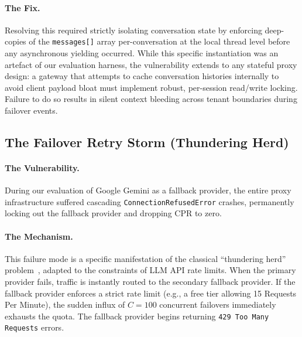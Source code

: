 \paragraph{The Fix.}
Resolving this required strictly isolating conversation state by enforcing deep-copies of the \texttt{messages[]} array per-conversation at the local thread level before any asynchronous yielding occurred. While this specific instantiation was an artefact of our evaluation harness, the vulnerability extends to any stateful proxy design: a gateway that attempts to cache conversation histories internally to avoid client payload bloat must implement robust, per-session read/write locking. Failure to do so results in silent context bleeding across tenant boundaries during failover events.

\subsection{The Failover Retry Storm (Thundering Herd)}

\paragraph{The Vulnerability.}
During our evaluation of Google Gemini as a fallback provider, the entire proxy infrastructure suffered cascading \texttt{ConnectionRefusedError} crashes, permanently locking out the fallback provider and dropping CPR to zero.

\paragraph{The Mechanism.}
This failure mode is a specific manifestation of the classical ``thundering herd'' problem~\cite{bonwick1994thundering}, adapted to the constraints of LLM API rate limits. When the primary provider fails, traffic is instantly routed to the secondary fallback provider. If the fallback provider enforces a strict rate limit (e.g., a free tier allowing 15 Requests Per Minute), the sudden influx of $C=100$ concurrent failovers immediately exhausts the quota. The fallback provider begins returning \texttt{429 Too Many Requests} errors.


